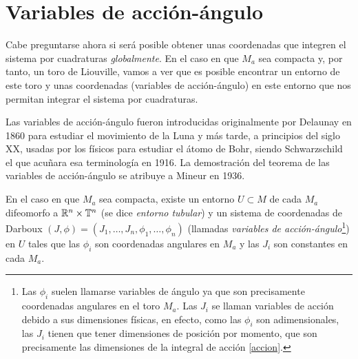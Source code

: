  \section{Variables de acción-ángulo}
 Cabe preguntarse ahora si será posible obtener unas coordenadas que integren el sistema por cuadraturas \emph{globalmente}. En el caso en que $M_a$ sea compacta y, por tanto, un toro de Liouville, vamos a ver que es posible encontrar un entorno de este toro y unas coordenadas (variables de acción-ángulo) en este entorno que nos permitan integrar el sistema por cuadraturas.
 
 Las variables de acción-ángulo fueron introducidas originalmente por Delaunay en 1860 para estudiar el movimiento de la Luna y más tarde, a principios del siglo XX, usadas por los físicos para estudiar el átomo de Bohr, siendo Schwarzschild el que acuñara esa terminología en 1916. La demostración del teorema de las variables de acción-ángulo se atribuye a Mineur en 1936. 

 \begin{thm}
   En el caso en que $M_a$ sea compacta, existe un entorno $U\subset M$ de cada $M_a$ difeomorfo a $\mathbb{R}^n \times \mathbb{T}^n$ (se dice \emph{entorno tubular}) y un sistema de coordenadas de Darboux $(J,\phi)=(J_1,\dots,J_n,\phi_1,\dots,\phi_n)$ (llamadas \emph{variables de acción-ángulo}\footnote{Las $\phi_i$ suelen llamarse variables de ángulo ya que son precisamente coordenadas angulares en el toro $M_a$. Las $J_i$ se llaman variables de acción debido a sus dimensiones físicas, en efecto, como las $\phi_i$ son adimensionales, las $J_i$ tienen que tener dimensiones de posición por momento, que son precisamente las dimensiones de la integral de acción \eqref{accion}.}) en $U$ tales que las $\phi_i$ son coordenadas angulares en $M_a$ y las $J_i$ son constantes en cada $M_a$. 
\end{thm}

